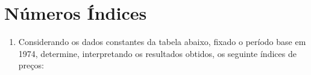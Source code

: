 \chapter{Números Índices}

\begin{enumerate}[resume]

\item Considerando os dados constantes da tabela abaixo, fixado o período base em 1974, determine, interpretando os resultados obtidos, os seguinte índices de preços:
	

\end{enumerate}
